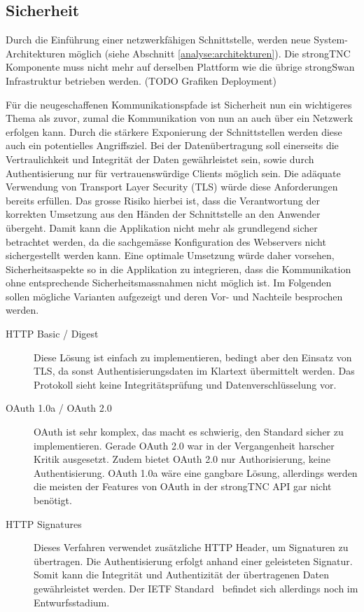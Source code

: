 \subsection{Sicherheit}

Durch die Einführung einer netzwerkfähigen Schnittstelle, werden neue
System-Architekturen möglich (siehe Abschnitt \ref{analyse:architekturen}). Die
strongTNC Komponente muss nicht mehr auf derselben Plattform wie die übrige
strongSwan Infrastruktur betrieben werden.  (TODO Grafiken Deployment)

Für die neugeschaffenen Kommunikationspfade ist Sicherheit nun ein wichtigeres
Thema als zuvor, zumal die Kommunikation von nun an auch über ein Netzwerk
erfolgen kann. Durch die stärkere Exponierung der Schnittstellen werden diese
auch ein potentielles Angriffsziel. Bei der Datenübertragung soll einerseits die
Vertraulichkeit und Integrität der Daten gewährleistet sein, sowie durch
Authentisierung nur für vertrauenswürdige Clients möglich sein. Die adäquate
Verwendung von Transport Layer Security (TLS) würde diese Anforderungen bereits
erfüllen. Das grosse Risiko hierbei ist, dass die Verantwortung der korrekten
Umsetzung aus den Händen der Schnittstelle an den Anwender übergeht. Damit kann
die Applikation nicht mehr als grundlegend sicher betrachtet werden, da die
sachgemässe Konfiguration des Webservers nicht sichergestellt werden kann. Eine
optimale Umsetzung würde daher vorsehen, Sicherheitsaspekte so in die
Applikation zu integrieren, dass die Kommunikation ohne entsprechende
Sicherheitsmassnahmen nicht möglich ist. Im Folgenden sollen mögliche Varianten
aufgezeigt und deren Vor- und Nachteile besprochen werden.

\begin{description}

\item [HTTP Basic / Digest] Diese Lösung ist einfach zu implementieren, bedingt
aber den Einsatz von TLS, da sonst Authentisierungsdaten im Klartext übermittelt
werden. Das Protokoll sieht keine Integritätsprüfung und Datenverschlüsselung
vor.

\item [OAuth 1.0a / OAuth 2.0] OAuth ist sehr komplex, das macht es schwierig,
den Standard sicher zu implementieren. Gerade OAuth 2.0 war in der Vergangenheit
harscher Kritik ausgesetzt\cite{hammer2012, homakov2013}. Zudem bietet OAuth 2.0
nur Authorisierung, keine Authentisierung. OAuth 1.0a wäre eine gangbare Lösung,
allerdings werden die meisten der Features von OAuth in der strongTNC API gar
nicht benötigt.

\item [HTTP Signatures] Dieses Verfahren verwendet zusätzliche HTTP Header, um
Signaturen zu übertragen. Die Authentisierung erfolgt anhand einer geleisteten
Signatur. Somit kann die Integrität und Authentizität der übertragenen Daten
gewährleistet werden. Der IETF Standard~\cite{httpsignatures2014} befindet sich allerdings noch im
Entwurfsstadium.

\end{description}

